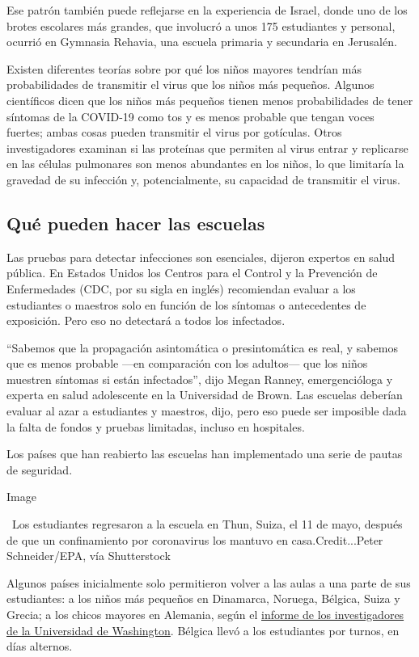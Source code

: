 Ese patrón también puede reflejarse en la experiencia de Israel, donde
uno de los brotes escolares más grandes, que involucró a unos 175
estudiantes y personal, ocurrió en Gymnasia Rehavia, una escuela
primaria y secundaria en Jerusalén.

Existen diferentes teorías sobre por qué los niños mayores tendrían más
probabilidades de transmitir el virus que los niños más pequeños.
Algunos científicos dicen que los niños más pequeños tienen menos
probabilidades de tener síntomas de la COVID-19 como tos y es menos
probable que tengan voces fuertes; ambas cosas pueden transmitir el
virus por gotículas. Otros investigadores examinan si las proteínas que
permiten al virus entrar y replicarse en las células pulmonares son
menos abundantes en los niños, lo que limitaría la gravedad de su
infección y, potencialmente, su capacidad de transmitir el virus.

\hypertarget{quuxe9-pueden-hacer-las-escuelas}{%
\subsection{Qué pueden hacer las
escuelas}\label{quuxe9-pueden-hacer-las-escuelas}}

Las pruebas para detectar infecciones son esenciales, dijeron expertos
en salud pública. En Estados Unidos los Centros para el Control y la
Prevención de Enfermedades (CDC, por su sigla en inglés) recomiendan
evaluar a los estudiantes o maestros solo en función de los síntomas o
antecedentes de exposición. Pero eso no detectará a todos los
infectados.

``Sabemos que la propagación asintomática o presintomática es real, y
sabemos que es menos probable ---en comparación con los adultos--- que
los niños muestren síntomas si están infectados'', dijo Megan Ranney,
emergencióloga y experta en salud adolescente en la Universidad de
Brown. Las escuelas deberían evaluar al azar a estudiantes y maestros,
dijo, pero eso puede ser imposible dada la falta de fondos y pruebas
limitadas, incluso en hospitales.

Los países que han reabierto las escuelas han implementado una serie de
pautas de seguridad.

Image

~Los estudiantes regresaron a la escuela en Thun, Suiza, el 11 de mayo,
después de que un confinamiento por coronavirus los mantuvo en
casa.Credit...Peter Schneider/EPA, vía Shutterstock

Algunos países inicialmente solo permitieron volver a las aulas a una
parte de sus estudiantes: a los niños más pequeños en Dinamarca,
Noruega, Bélgica, Suiza y Grecia; a los chicos mayores en Alemania,
según el
\href{https://globalhealth.washington.edu/sites/default/files/COVID-19\%20Schools\%20Summary\%20\%282\%29.pdf?mkt_tok=eyJpIjoiTkRreE5XWXlORFF3TXpNeCIsInQiOiJIbVNQTTVySEo0Vzk1cHVBZVVqWnFGVmR1UEJxRGdpd01mTXg4OGw3Mk5nTnpmaUoyMGt2UXIwWVZBOE5GVjIybHA5aStrbzJ3MUxsanoxamZibmlocmpSbXZyVFVoV0VHYU1aTGx0RnpsMXlmOEtXSVJqaDJsZ0RJU1BQcVZjZSJ9}{informe
de los investigadores de la Universidad de Washington}. Bélgica llevó a
los estudiantes por turnos, en días alternos.

